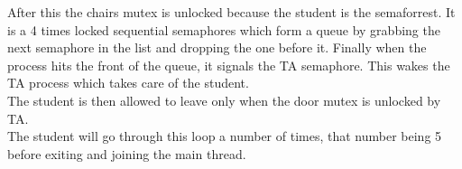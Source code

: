 \documentclass[11pt]{article}
\begin{document}
After this the chairs mutex is unlocked because the student is the semaforrest. It is a 4 times locked sequential semaphores which form a queue by grabbing the next semaphore in the list and dropping the one before it. Finally when the process hits the front of the queue, it signals the TA semaphore. This wakes the TA process which takes care of the student.\\

The student is then allowed to leave only when the door mutex is unlocked by TA.\\


The student will go through this loop a number of times, that number being 5 before exiting and joining the main thread.
\end{document}
